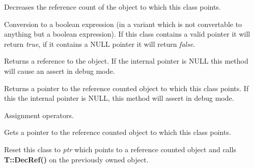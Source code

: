 \label{wxobjectdataptrdtor}


Decreases the reference count of the object to which this
class points.

\label{wxobjectdataptroperatorbool}


Conversion to a boolean expression (in a variant which is not 
convertable to anything but a boolean expression). If this class
contains a valid pointer it will return {\it true}, if it contains
a NULL pointer it will return {\it false}.

\label{wxobjectdataptroperatorreft}


Returns a reference to the object. If the internal pointer is NULL
this method will cause an assert in debug mode.

\label{wxobjectdataptroperatorpointer}


Returns a pointer to the reference counted object to which
this class points. If this the internal pointer is NULL,
this method will assert in debug mode.

\label{wxobjectdataptroperatorassign}



Assignment operators.

\label{wxobjectdataptrget}


Gets a pointer to the reference counted object to which
this class points.

\label{wxobjectdataptrreset}


Reset this class to {\it ptr} which points to a reference
counted object and calls {\bf T::DecRef()} on the previously
owned object.
